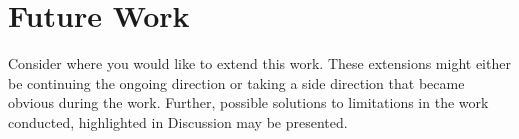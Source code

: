 \section{Future Work}

Consider where you would like to extend this work. These extensions might either be continuing the ongoing direction or taking a side direction that became obvious during the work. Further, possible solutions to limitations in the work conducted, highlighted in Discussion may be presented.